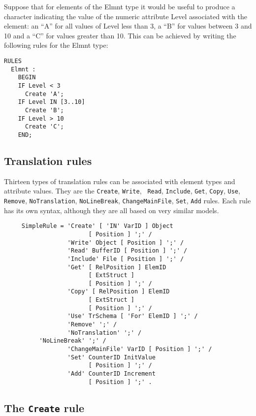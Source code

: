 \begin{example}
Suppose that for elements of the Elmnt type it would be useful to
produce a character indicating the value of the numeric attribute
Level associated with the element: an  ``A'' for all values of Level
less than 3, a ``B'' for values between 3 and 10 and a ``C'' for
values greater than 10.  This can be achieved by writing the following
rules for the Elmnt type:
\begin{verbatim}
RULES
  Elmnt :
    BEGIN
    IF Level < 3
      Create 'A';
    IF Level IN [3..10]
      Create 'B';
    IF Level > 10
      Create 'C';
    END;
\end{verbatim}
\end{example}

\subsection{Translation rules}

Thirteen types of translation rules can be associated with element types
and attribute values.  They are the {\tt Create}, {\tt Write}, {\tt
Read}, {\tt Include}, {\tt Get}, {\tt Copy}, {\tt Use}, {\tt Remove},
{\tt NoTranslation}, {\tt NoLineBreak}, {\tt ChangeMainFile}, {\tt Set},
{\tt Add} rules.
Each rule has its own syntax, although they are all based on very
similar models.

\begin{verbatim}
     SimpleRule = 'Create' [ 'IN' VarID ] Object
                        [ Position ] ';' /
                  'Write' Object [ Position ] ';' /
                  'Read' BufferID [ Position ] ';' /
                  'Include' File [ Position ] ';' /
                  'Get' [ RelPosition ] ElemID 
                        [ ExtStruct ] 
                        [ Position ] ';' /
                  'Copy' [ RelPosition ] ElemID 
                        [ ExtStruct ] 
                        [ Position ] ';' /
                  'Use' TrSchema [ 'For' ElemID ] ';' /
                  'Remove' ';' /
                  'NoTranslation' ';' /
		  'NoLineBreak' ';' /
                  'ChangeMainFile' VarID [ Position ] ';' /
                  'Set' CounterID InitValue
                        [ Position ] ';' /
                  'Add' CounterID Increment
                        [ Position ] ';' .
\end{verbatim}

\subsection{The {\tt Create} rule}
\label{create}

